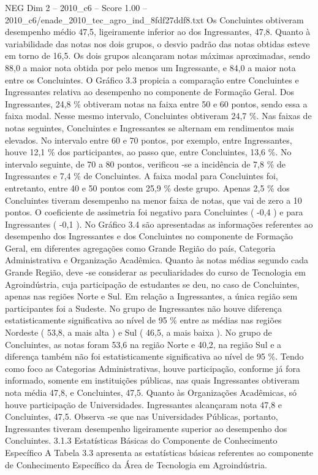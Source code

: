 \begin{textsample}{NEG Dim 2 – 2010\_c6 – Score 1.00 – 2010\_c6/enade\_2010\_tec\_agro\_ind\_8fdf27ddf8.txt}
Os Concluintes obtiveram desempenho médio 47,5, ligeiramente inferior ao dos Ingressantes, 47,8.
Quanto à variabilidade das notas nos dois grupos, o desvio padrão das notas obtidas esteve em torno de 16,5.
Os dois grupos alcançaram notas máximas aproximadas, sendo 88,0 a maior nota obtida por pelo menos um Ingressante, e 84,0 a maior nota entre os Concluintes.
O Gráfico 3.3 propicia a comparação entre Concluintes e Ingressantes relativa ao desempenho no componente de Formação Geral.
Dos Ingressantes, 24,8 \% obtiveram notas na faixa entre 50 e 60 pontos, sendo essa a faixa modal.
Nesse mesmo intervalo, Concluintes obtiveram 24,7 \%.
Nas faixas de notas seguintes, Concluintes e Ingressantes se alternam em rendimentos mais elevados.
No intervalo entre 60 e 70 pontos, por exemplo, entre Ingressantes, houve 12,1 \% dos participantes, ao passo que, entre Concluintes, 13,6 \%.
No intervalo seguinte, de 70 a 80 pontos, verificou -se a incidência de 7,8 \% de Ingressantes e 7,4 \% de Concluintes.
A faixa modal para Concluintes foi, entretanto, entre 40 e 50 pontos com 25,9 \% deste grupo.
Apenas 2,5 \% dos Concluintes tiveram desempenho na menor faixa de notas, que vai de zero a 10 pontos.
O coeficiente de assimetria foi negativo para Concluintes ( -0,4 ) e para Ingressantes ( -0,1 ).
No Gráfico 3.4 são apresentadas as informações referentes ao desempenho dos Ingressantes e dos Concluintes no componente de Formação Geral, em diferentes agregações como Grande Região do país, Categoria Administrativa e Organização Acadêmica.
Quanto às notas médias segundo cada Grande Região, deve -se considerar as peculiaridades do curso de Tecnologia em Agroindústria, cuja participação de estudantes se deu, no caso de Concluintes, apenas nas regiões Norte e Sul.
Em relação a Ingressantes, a única região sem participantes foi a Sudeste.
No grupo de Ingressantes não houve diferença estatisticamente significativa ao nível de 95 \% entre as médias nas regiões Nordeste ( 53,8, a mais alta ) e Sul ( 46,5, a mais baixa ).
No grupo de Concluintes, as notas foram 53,6 na região Norte e 40,2, na região Sul e a diferença também não foi estatisticamente significativa ao nível de 95 \%.
Tendo como foco as Categorias Administrativas, houve participação, conforme já fora informado, somente em instituições públicas, nas quais Ingressantes obtiveram nota média 47,8, e Concluintes, 47,5.
Quanto às Organizações Acadêmicas, só houve participação de Universidades.
Ingressantes alcançaram nota 47,8 e Concluintes, 47,5.
Observa -se que nas Universidades Públicas, portanto, Ingressantes tiveram desempenho ligeiramente superior ao desempenho dos Concluintes. 3.1.3 Estatísticas Básicas do Componente de Conhecimento Específico A Tabela 3.3 apresenta as estatísticas básicas referentes ao componente de Conhecimento Específico da Área de Tecnologia em Agroindústria.

\end{textsample}
